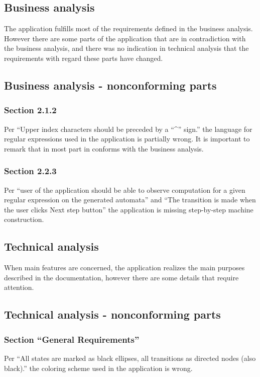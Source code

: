 \documentclass{article}
\begin{document}
\subsection{Business analysis}
The application fulfills most of the requirements defined in the business analysis. However there
are some parts of the application that are in contradiction with the business analysis, and there
was no indication in technical analysis that the requirements with regard these parts have changed.

\subsection{Business analysis - nonconforming parts}

\subsubsection{Section 2.1.2}
Per ``Upper index characters should be preceded by a “\^{}” sign.'' the language for regular
expressions used in the application is partially wrong. It is important to remark that in most part
in conforms with the business analysis.

\subsubsection{Section 2.2.3}
Per ``user of the application should be able to observe computation for a given regular expression
on the generated automata'' and ``The transition is made when the user clicks Next step button'' the
application is missing step-by-step machine construction.

\newpage

\subsection{Technical analysis}
When main features are concerned, the application realizes the main purposes described in the
documentation, however there are some details that require attention.

\subsection{Technical analysis - nonconforming parts}

\subsubsection{Section ``General Requirements''}
Per ``All states are marked as black ellipses, all transitions as directed nodes (also black).'' the
coloring scheme used in the application is wrong.
\end{document}
